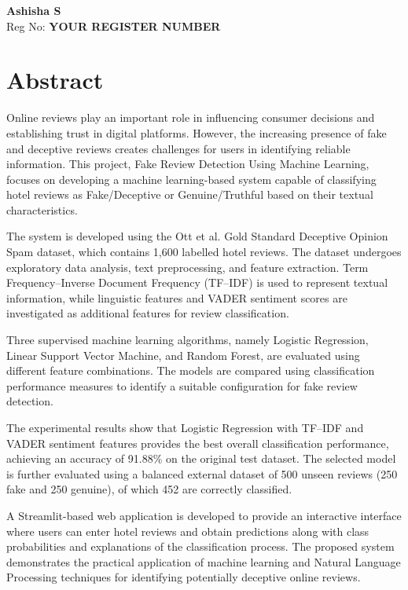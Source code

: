 \documentclass[12pt,a4paper]{report}
\begin{document}
\begin{flushright}
\textbf{Ashisha S}\\
Reg No: \textbf{YOUR REGISTER NUMBER}
\end{flushright}


\newpage

\chapter*{Abstract}
{}

Online reviews play an important role in influencing
consumer decisions and establishing trust in digital
platforms. However, the increasing presence of fake
and deceptive reviews creates challenges for users
in identifying reliable information. This project,
Fake Review Detection Using Machine Learning,
focuses on developing a machine learning-based
system capable of classifying hotel reviews as
Fake/Deceptive or Genuine/Truthful based on
their textual characteristics.

The system is developed using the Ott et al.
Gold Standard Deceptive Opinion Spam dataset,
which contains 1,600 labelled hotel reviews.
The dataset undergoes exploratory data analysis,
text preprocessing, and feature extraction.
Term Frequency--Inverse Document Frequency
(TF--IDF) is used to represent textual information,
while linguistic features and VADER sentiment
scores are investigated as additional features
for review classification.

Three supervised machine learning algorithms,
namely Logistic Regression, Linear Support Vector
Machine, and Random Forest, are evaluated using
different feature combinations. The models are
compared using classification performance measures
to identify a suitable configuration for fake
review detection.

The experimental results show that Logistic
Regression with TF--IDF and VADER sentiment
features provides the best overall classification
performance, achieving an accuracy of 91.88\%
on the original test dataset. The selected model
is further evaluated using a balanced external
dataset of 500 unseen reviews (250 fake and
250 genuine), of which 452 are correctly classified.

A Streamlit-based web application is developed
to provide an interactive interface where users
can enter hotel reviews and obtain predictions
along with class probabilities and explanations
of the classification process. The proposed
system demonstrates the practical application
of machine learning and Natural Language
Processing techniques for identifying
potentially deceptive online reviews.
\end{document}
